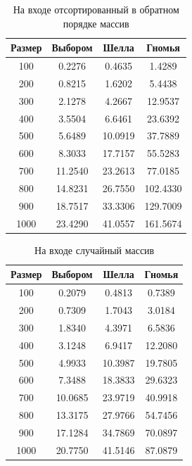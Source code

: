 \begin{table}[h]
	\begin{center}
		\begin{threeparttable}
		\captionsetup{justification=raggedleft,singlelinecheck=off}
		\caption{На входе отсортированный в обратном порядке массив}
		\label{tbl:worst}
		\begin{tabular}{|c|c|c|c|}
			\hline
			Размер & Выбором & Шелла & Гномья \\
			\hline
  			100 & 0.2276 & 0.4635 & 1.4289 \\ 
 			\hline
  			200 & 0.8215 & 1.6202 & 5.4438 \\ 
 			\hline
  			300 & 2.1278 & 4.2667 & 12.9537 \\ 
 			\hline
  			400 & 3.5504 & 6.6461 & 23.6392 \\ 
 			\hline
  			500 & 5.6489 & 10.0919 & 37.7889 \\ 
 			\hline
  			600 & 8.3033 & 17.7157 & 55.5283 \\ 
 			\hline
  			700 & 11.2540 & 23.2613 & 77.0185 \\ 
			\hline
  			800 & 14.8231 & 26.7550 & 102.4330 \\ 
 			\hline
  			900 & 18.7517 & 33.3306 & 129.7009 \\ 
 			\hline
 			1000 & 23.4290 & 41.0557 & 161.5674 \\ 
 			\hline
		\end{tabular}
		\end{threeparttable}
    \end{center}
\end{table}

\begin{table}[h]
	\begin{center}
		\begin{threeparttable}
		\captionsetup{justification=raggedleft,singlelinecheck=off}
		\caption{На входе случайный массив}
		\label{tbl:random}
		\begin{tabular}{|c|c|c|c|}
			\hline
			Размер & Выбором & Шелла & Гномья \\
			\hline
  			100 & 0.2079 & 0.4813 & 0.7389 \\ 
 			\hline
  			200 & 0.7309 & 1.7043 & 3.0184 \\ 
 			\hline
  			300 & 1.8340 & 4.3971 & 6.5836 \\ 
 			\hline
  			400 & 3.1248 & 6.9417 & 12.2080 \\ 
 			\hline
  			500 & 4.9933 & 10.3987 & 19.7805 \\ 
 			\hline
  			600 & 7.3488 & 18.3833 & 29.6323 \\ 
 			\hline
  			700 & 10.0685 & 23.9719 & 40.9918 \\ 
 			\hline
  			800 & 13.3175 & 27.9766 & 54.7456 \\ 
 			\hline
  			900 & 17.1284 & 34.7869 & 70.0897 \\ 
 			\hline
 			1000 & 20.7750 & 41.5146 & 87.0879 \\ 
 			\hline
		\end{tabular}
		\end{threeparttable}
    \end{center}
\end{table}

